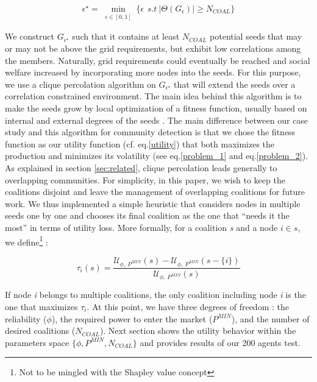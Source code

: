 \documentclass[conference]{IEEEtran}
\begin{document}
\begin{equation}
\epsilon^{\star} = \min_{\substack{ \epsilon \in [0,1] }} \Big\{ \epsilon\,\ s.t\ |\Theta(G_{\epsilon})| \geq N_{COAL} \Big\}
\end{equation}

We construct $ G_{\epsilon^{\star}} $ such that it contains at least $ N_{COAL} $ potential seeds that may or may not be above the grid requirements, but exhibit low correlations among the members. Naturally, grid requirements could eventually be reached and social welfare increased by incorporating more nodes into the seeds. For this purpose, we use a clique percolation algorithm on $ G_{\epsilon^{\star}} $ that will extend the seeds over a correlation constrained environment. The main idea behind this algorithm is to make the seeds grow by local optimization of a fitness function, usually based on internal and external degrees of the seeds \cite{Lancichinetti}. The main difference between our case study and this algorithm for community detection is that we chose the fitness function as our utility function (cf. eq.\eqref{utility}) that both maximizes the production and minimizes its volatility (see eq.\ref{problem_1} and eq.\ref{problem_2}). As explained in section \ref{sec:related}, clique percolation leads generally to overlapping communities. For simplicity, in this paper, we wish to keep the coalitions disjoint and  leave the management of overlapping coalitions for future work. We thus implemented a simple heuristic that considers nodes in multiple seeds one by one and chooses its final coalition as the one that “needs it the most” in terms of utility loss. More formally, for a coalition \textit{s} and a node $ i \in s $, we define\footnote{\label{note1}Not to be mingled with the Shapley value concept} :

\begin{equation}
\tau_{i}(s) = \dfrac{\mathcal{U}_{\phi,\ P^{MIN}}(s) - \mathcal{U}_{\phi,\ P^{MIN}}(s-\{i\}) }{\mathcal{U}_{\phi,\ P^{MIN}}(s)}
\label{tau}
\end{equation}

If node \textit{i} belongs to  multiple coalitions, the only coalition including node \textit{i} is the one that maximizes $ \tau_{i} $. At this point, we have three degrees of freedom : the reliability ($ \phi $), the required power to enter the market ($P^{MIN}$), and the number of desired coalitions ($ N_{COAL} $). Next section shows the utility behavior within the parameters space $ \{\phi,P^{MIN},N_{COAL} \} $ and provides results of our 200 agents test.
\end{document}
